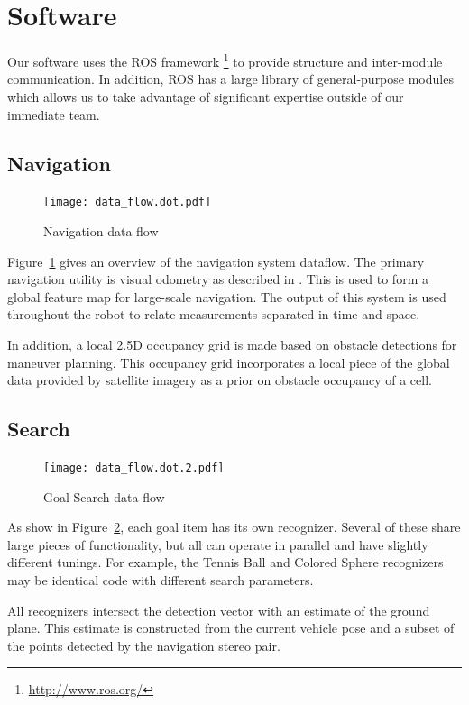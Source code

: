 \documentclass[12pt]{article}
\begin{document}
\section{Software}\label{Software}
Our software uses the ROS framework \footnote{\url{http://www.ros.org/}} to provide structure and inter-module communication. In addition, ROS has a large library of general-purpose modules which allows us to take advantage of significant expertise outside of our immediate team.

\subsection{Navigation}\label{Navigation}
\begin{figure}[htbp]
\centering
\texttt{[image: data\_flow.dot.pdf]}
\caption{Navigation data flow}
\label{fig_df_nav}
\end{figure}
Figure~\ref{fig_df_nav} gives an overview of the navigation system dataflow. The primary navigation utility is visual odometry as described in \cite{HStrasDWO}. This is used to form a global feature map for large-scale navigation. The output of this system is used throughout the robot to relate measurements separated in time and space.

In addition, a local 2.5D occupancy grid is made based on obstacle detections for maneuver planning. This occupancy grid incorporates a local piece of the global data provided by satellite imagery as a prior on obstacle occupancy of a cell.

\subsection{Search}\label{Search}
\begin{figure}[htbp]
\centering
\texttt{[image: data\_flow.dot.2.pdf]}
\caption{Goal Search data flow}
\label{fig_df_gs}
\end{figure}
As show in Figure~\ref{fig_df_gs}, each goal item has its own recognizer. Several of these share large pieces of functionality, but all can operate in parallel and have slightly different tunings. For example, the Tennis Ball and Colored Sphere recognizers may be identical code with different search parameters.

All recognizers intersect the detection vector with an estimate of the ground plane. This estimate is constructed from the current vehicle pose and a subset of the points detected by the navigation stereo pair.
\end{document}
